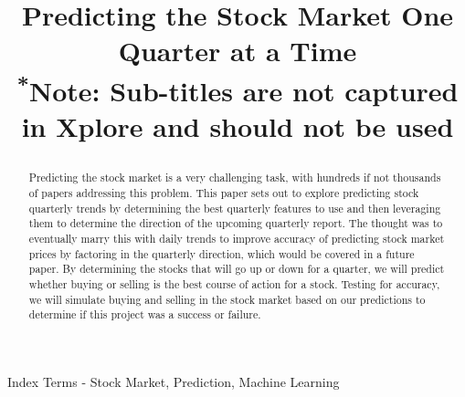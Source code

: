 \documentclass[conference]{IEEEtran}
\begin{document}
\title{Predicting the Stock Market One Quarter at a Time\\
{\footnotesize \textsuperscript{*}Note: Sub-titles are not captured in Xplore and
should not be used}

}

\author{
\and
{}
}

\maketitle



\begin{abstract}
Predicting the stock market is a very challenging task, with hundreds if not thousands of papers addressing this problem.  This paper sets out to explore predicting stock quarterly trends by determining the best quarterly features to use and then leveraging them to determine the direction of the upcoming quarterly report. The thought was to eventually marry this with daily trends to improve accuracy of predicting stock market prices by factoring in the quarterly direction, which would be covered in a future paper.  By determining the stocks that will go up or down for a quarter, we will predict whether buying or selling is the best course of action for a stock. Testing for accuracy, we will simulate buying and selling in the stock market based on our predictions to determine if this project was a success or failure.  

\end{abstract}

\begin{IEEEkeywords}
Index Terms - Stock Market, Prediction, Machine Learning
\end{IEEEkeywords}


\end{document}
